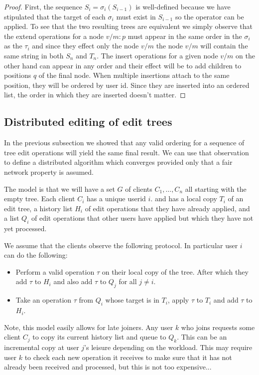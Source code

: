 \documentclass{amsart}
\begin{document}
\begin{proof}
First, the sequence $S_{i}=\sigma_i(S_{i-1})$ is well-defined because we have
stipulated that the target of each $\sigma_i$ must exist in $S_{i-1}$ so the
operator can be applied. To see that the two resulting trees are equivalent
we simply observe that the extend operations for a node $v/m:p$ must appear
in the same order in the $\sigma_i$ as the $\tau_i$ and since they effect only
the node $v/m$ the node $v/m$ will contain the same string in both $S_n$ and $T_n$.
The insert operations for a given node $v/m$ on the other hand can appear
in any order and their effect will be to add children to positions $q$
of the final node. When multiple insertions attach to the same position, they
will be ordered by user id. Since they are inserted into an ordered list,
the order in which they are inserted doesn't matter.
\end{proof}

\subsection{Distributed editing of edit trees}
In the previous subsection we showed that any valid ordering for a sequence
of tree edit operations will yield the same final result. We can use that
observation to define a distributed algorithm which converges provided only
that a fair network property is assumed.

The model is that we will have a set $G$ of clients $C_1,\ldots,C_n$
all starting with the empty tree. Each client $C_i$ has a unique userid $i$.
and has a local copy $T_i$ of an edit tree,
a history list $H_i$ of edit operations that they have already applied, and
a list $Q_i$ of edit operations that other users have applied but which they
have not yet processed.

We assume that the clients observe the following protocol. 
In particular user $i$ can do the following:
\begin{itemize}
\item Perform a valid operation $\tau$ on their local copy of the tree.
After which they add $\tau$ to $H_i$ and also add $\tau$ to $Q_j$ for
all $j\ne i$.
\item Take an operation $\tau$ from $Q_i$ whose target is in $T_i$, apply
$\tau$ to $T_i$ and add $\tau$ to $H_i$.
\end{itemize}
Note, this model easily allows for late joiners.  Any user $k$ who joins
requests some client $C_j$ to copy its current history list and queue
to $Q_k$. This can be an incremental copy at user $j$'s leisure depending
on the workload.  This may require user $k$ to check each new operation
it receives to make sure that it has not already been received and processed,
but this is not too expensive...
\end{document}
